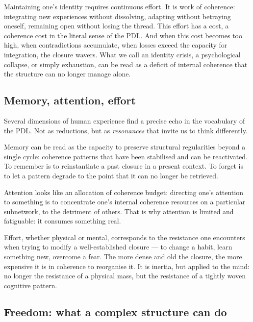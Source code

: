 \documentclass[11pt, a4paper, openright]{book}
\begin{document}
\medskip

Maintaining one’s identity requires continuous effort. It is work of coherence: integrating new experiences without dissolving, adapting without betraying oneself, remaining open without losing the thread. This effort has a cost, a coherence cost in the literal sense of the PDL. And when this cost becomes too high, when contradictions accumulate, when losses exceed the capacity for integration, the closure wavers. What we call an identity crisis, a psychological collapse, or simply exhaustion, can be read as a deficit of internal coherence that the structure can no longer manage alone.

\subsection*{Memory, attention, effort}

Several dimensions of human experience find a precise echo in the vocabulary of the PDL. Not as reductions, but as \emph{resonances} that invite us to think differently.

\medskip

Memory can be read as the capacity to preserve structural regularities beyond a single cycle: coherence patterns that have been stabilised and can be reactivated. To remember is to reinstantiate a past closure in a present context. To forget is to let a pattern degrade to the point that it can no longer be retrieved.

\medskip

Attention looks like an allocation of coherence budget: directing one’s attention to something is to concentrate one’s internal coherence resources on a particular subnetwork, to the detriment of others. That is why attention is limited and fatiguable: it consumes something real.

\medskip

Effort, whether physical or mental, corresponds to the resistance one encounters when trying to modify a well-established closure — to change a habit, learn something new, overcome a fear. The more dense and old the closure, the more expensive it is in coherence to reorganise it. It is inertia, but applied to the mind: no longer the resistance of a physical mass, but the resistance of a tightly woven cognitive pattern.

\subsection*{Freedom: what a complex structure can do}
\end{document}
